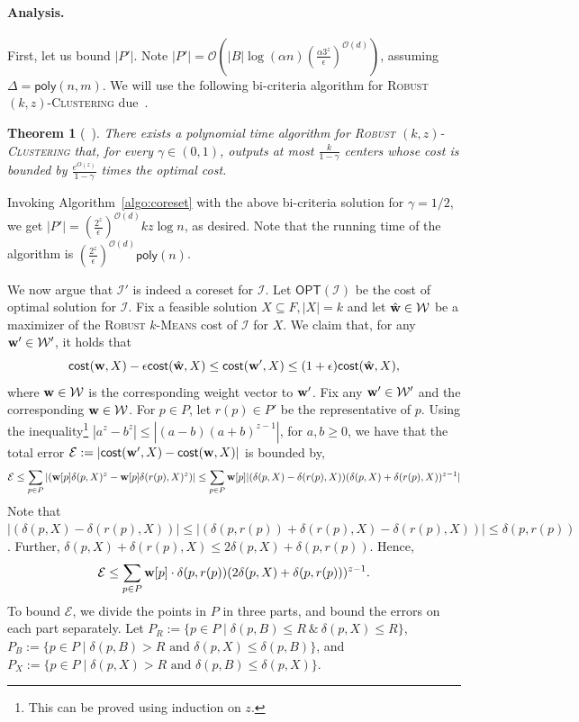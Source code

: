 \documentclass[11pt]{article}
\newtheorem{theorem}{Theorem}[section]
\newcommand{\opt}{\ensuremath{\textsf{OPT}}}
\newcommand{\cost}{\ensuremath{\textsf{cost}}}
\newcommand{\poly}{\ensuremath{\textsf{poly}}}
\newcommand{\rkc}{\textsc{Robust $(k,z)$-Clustering}\xspace}
\newcommand{\rkm}{\textsc{Robust $k$-Means}\xspace}
\newcommand{\OO}{\mathcal{O}}
\newcommand{\bigO}[1]{\ensuremath{\mathcal{O}\left(#1\right)}}
\newcommand{\vecw}{{\bf w}\xspace}
\newcommand{\vcw}{{\bf w}\xspace}
\newcommand{\cE}{\ensuremath{\mathcal{E}}\xspace}
\newcommand{\cI}{\ensuremath{\mathcal{I}}\xspace}
\newcommand{\cW}{\ensuremath{\mathcal{W}}\xspace}
\begin{document}
\paragraph*{Analysis.}
First, let us bound $|P'|$. 
Note $|P'|= \OO(|B|\log(\alpha n) \left(\frac{\alpha 3^z}{\epsilon}\right)^{\bigO{d}})$, assuming $\Delta = \poly(n,m)$.
We will use the following bi-criteria algorithm for \rkc due~\cite{pmlr-v134-makarychev21a}.
\begin{theorem}[~\cite{pmlr-v134-makarychev21a}]\label{thm:res:bic}
There exists a polynomial time algorithm for \rkc  that, for every $\gamma \in (0,1)$, outputs at most $\frac{k}{1-\gamma}$ centers whose cost is bounded by $\frac{e^{O(z)}}{1-\gamma}$ times the optimal cost. 
\end{theorem}
%
Invoking Algorithm~\ref{algo:coreset} with the above bi-criteria solution for $\gamma=1/2$, we get $|P'|= \left(\frac{2^z}{\epsilon}\right)^{\bigO{d}} kz\log n$, as desired. Note that the running time of the algorithm is $\left(\frac{2^z}{\epsilon}\right)^{\bigO{d}}\poly(n)$.

 We now argue that $\cI'$ is indeed a coreset for $\cI$.
    Let $\opt(\cI)$ be the cost of optimal solution for $\cI$.
    Fix a feasible solution $X \subseteq F, |X|=k$ and let $\hat{\vcw} \in \cW$ be a maximizer of the \rkm cost of $\cI$ for $X$. We claim that, for any $\vcw' \in \cW'$, it holds that
       \[
                \cost(\vcw,X) - \epsilon \cost(\hat{\vcw},X) \le \cost(\vcw',X) \le (1+\epsilon) \cost(\hat{\vcw},X),
    \]
    where  $\vcw \in \cW$ is the corresponding weight vector to $\vcw'$. Fix any $\vcw' \in \cW'$ and the corresponding $\vcw \in \cW$.
For $p \in P$, let $r(p)\in P'$ be the representative of $p$.
Using the inequality\footnote{This can be proved using induction on $z$.}  $|a^z-b^z| \le |(a-b)(a+b)^{z-1}|$, for $a,b\ge 0$, we have that the total error $\cE:=|\cost(\vecw',X) -\cost(\vecw,X)|$ is bounded by, 
\[
\cE  \le \sum_{p \in P} |(\vecw[p]\delta(p,X)^z - \vecw[p]\delta(r(p),X)^z)|\le \sum_{p \in P} \vecw[p]|(\delta(p,X) - \delta(r(p),X))(\delta(p,X) + \delta(r(p),X))^{z-1}|
\]
Note that $|(\delta(p,X) - \delta(r(p),X))| \le |(\delta(p,r(p)) + \delta(r(p),X) - \delta(r(p),X))| \le \delta(p,r(p))$. Further, $\delta(p,X) + \delta(r(p),X) \le 2\delta(p,X) + \delta(p,r(p))$. Hence,
\[
\cE \le \sum_{p \in P} \vecw[p] \cdot \delta(p,r(p)) (2\delta(p,X) + \delta(p,r(p)))^{z-1}.
\]
To bound $\cE$, we divide the points in $P$ in three parts, and bound the errors on each part separately. Let $P_R:=\{p \in P \mid \delta(p,B) \le R \ \&\  \delta(p,X)\le R\}$, $P_B:= \{p \in P \mid \delta(p,B) > R \text{ and } \delta(p,X) \le \delta(p,B) \}$,  and $P_X:= \{p \in P \mid \delta(p,X) > R \text{ and } \delta(p,B) \le \delta(p,X)\}$.
\end{document}
